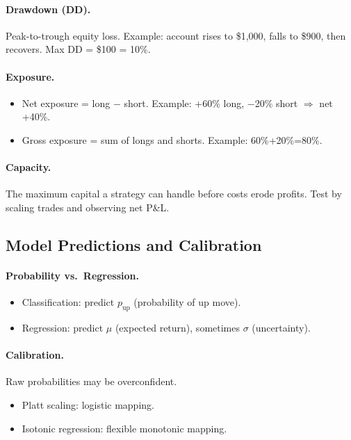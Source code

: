 \documentclass[11pt]{article}
\begin{document}
    \paragraph{Drawdown (DD).}
    Peak-to-trough equity loss.
    Example: account rises to \$1{,}000, falls to \$900, then recovers. Max DD = \$100 = 10\%.

    \paragraph{Exposure.}
    \begin{itemize}
        \item Net exposure = long $-$ short. Example: +60\% long, $-$20\% short $\Rightarrow$ net +40\%.
        \item Gross exposure = sum of longs and shorts. Example: 60\%+20\%=80\%.
    \end{itemize}

    \paragraph{Capacity.}
    The maximum capital a strategy can handle before costs erode profits. Test by scaling trades and observing net P\&L.

    \subsection{Model Predictions and Calibration}

    \paragraph{Probability vs.\ Regression.}
    \begin{itemize}
        \item Classification: predict $p_{\text{up}}$ (probability of up move).
        \item Regression: predict $\mu$ (expected return), sometimes $\sigma$ (uncertainty).
    \end{itemize}

    \paragraph{Calibration.}
    Raw probabilities may be overconfident.
    \begin{itemize}
        \item Platt scaling: logistic mapping.
        \item Isotonic regression: flexible monotonic mapping.
    \end{itemize}
\end{document}
